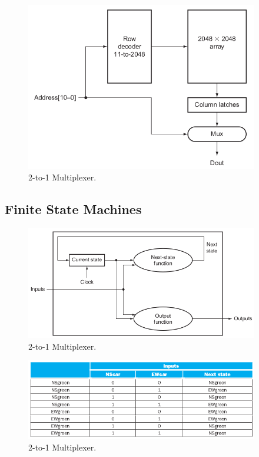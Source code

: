 \documentclass[a4paper, 11pt,oneside]{article}
\begin{document}
\begin{figure}[H]
	\begin{center}
	\includegraphics[width=4in]{dram0.png}
	\caption{2-to-1 Multiplexer.}
	\label{fig:mux} 
	\end{center}
\end{figure}


\subsection{Finite State Machines}

\begin{figure}[H]
	\begin{center}
	\includegraphics[width=4in]{fsm0.png}
	\caption{2-to-1 Multiplexer.}
	\label{fig:mux} 
	\end{center}
\end{figure}

\begin{figure}[H]
	\begin{center}
	\includegraphics[width=4in]{fsm1.png}
	\caption{2-to-1 Multiplexer.}
	\label{fig:mux} 
	\end{center}
\end{figure}
\end{document}
